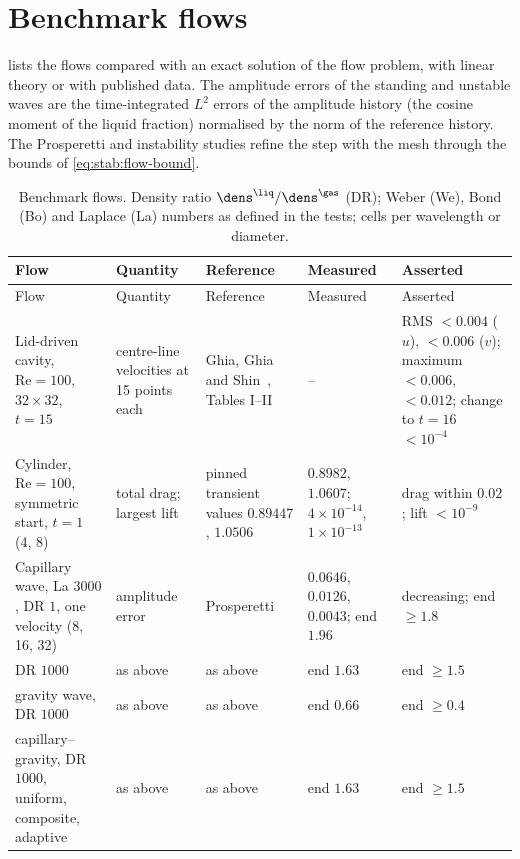 \section{Benchmark flows}\label{sec:verif:benchmarks}
 lists the flows compared with an exact solution of
the flow problem, with linear theory or with published data. The amplitude
errors of the standing and unstable waves are the time-integrated $L^2$
errors of the amplitude history (the cosine moment of the liquid fraction)
normalised by the norm of the reference history. The Prosperetti and
instability studies refine the step with the mesh through the bounds of
\cref{eq:stab:flow-bound}.

{\footnotesize\setlength\tabcolsep{3pt}
\begin{longtable}{@{}>{\raggedright}p{2.35cm}>{\raggedright}p{2.5cm}>{\raggedright}p{2.3cm}>{\raggedright}p{2.45cm}>{\raggedright\arraybackslash}p{2.5cm}@{}}
  \caption{Benchmark flows. Density ratio $\dens^{\liq}/\dens^{\gas}$
  (DR); Weber (We), Bond (Bo) and Laplace (La) numbers as defined in the
  tests; cells per wavelength or diameter.}\label{tab:verif:benchmarks}\\
  \toprule
  Flow & Quantity & Reference & Measured & Asserted\\
  \midrule
  \endfirsthead
  \toprule
  Flow & Quantity & Reference & Measured & Asserted\\
  \midrule
  \endhead
  \bottomrule
  \endfoot
  Lid-driven cavity, $\mathrm{Re}=100$, $32\times32$, $t=15$ & centre-line velocities at 15 points each & Ghia, Ghia and Shin~\cite{ghia1982}, Tables I--II & -- & RMS $<0.004$ ($u$), $<0.006$ ($v$); maximum $<0.006$, $<0.012$; change to $t=16$ $<10^{-4}$\\
  Cylinder, $\mathrm{Re}=100$, symmetric start, $t=1$ (4, 8) & total drag; largest lift & pinned transient values $0.89447$, $1.0506$ & $0.8982$, $1.0607$; $4\times10^{-14}$, $1\times10^{-13}$ & drag within $0.02$; lift $<10^{-9}$\\
  Capillary wave, La $3000$, DR $1$, one velocity (8, 16, 32) & amplitude error & Prosperetti~\cite{prosperetti1981} & $0.0646$, $0.0126$, $0.0043$; end $1.96$ & decreasing; end $\ge1.8$\\
  \quad DR $1000$ & as above & as above & end $1.63$ & end $\ge1.5$\\
  \quad gravity wave, DR $1000$ & as above & as above & end $0.66$ & end $\ge0.4$\\
  \quad capillary--gravity, DR $1000$, uniform, composite, adaptive & as above & as above & end $1.63$ & end $\ge1.5$\\

\end{longtable}}
